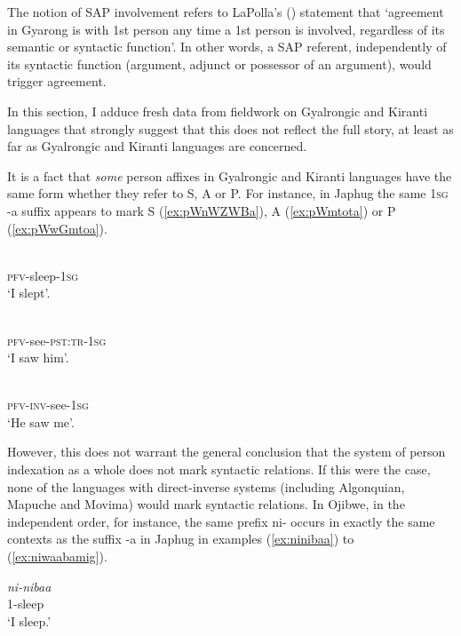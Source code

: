 \documentclass[oldfontcommands,oneside,a4paper,11pt]{article}
\newcommand{\ipa}[1]{{\phon \mbox{#1}}} %
\begin{document}
The notion of SAP involvement refers to LaPolla's (\citeyear[308]{lapolla92}) statement that `agreement in Gyarong is with 1st person any time a 1st person is involved, regardless of its semantic or syntactic function'. In other words, a SAP referent, independently of its syntactic function (argument, adjunct or possessor of an argument), would trigger agreement. 

In this section,  I adduce fresh data from fieldwork on Gyalrongic and Kiranti languages that strongly suggest that this does not reflect the full story, at least as far as Gyalrongic and Kiranti languages are concerned.

It is a fact that \textit{some} person affixes in Gyalrongic and Kiranti languages have the same form whether they refer to S, A or P. For instance, in Japhug the same \textsc{1sg} \ipa{-a} suffix appears to mark S (\ref{ex:pWnWZWBa}), A (\ref{ex:pWmtota}) or P (\ref{ex:pWwGmtoa}).

\begin{exe}
\ex \label{ex:pWnWZWBa}
\gll \ipa{pɯ-nɯʑɯβ-a} \\
\textsc{pfv}-sleep-\textsc{1sg} \\
\glt `I slept'.
\end{exe}

\begin{exe}
\ex \label{ex:pWmtota}
\gll \ipa{pɯ-mto-t-a} \\
\textsc{pfv}-see-\textsc{pst:tr}-\textsc{1sg} \\
\glt `I saw him'.
\end{exe}

\begin{exe}
\ex \label{ex:pWwGmtoa}
\gll \ipa{pɯ́-wɣ-mto-a} \\
\textsc{pfv}-\textsc{inv}-see-\textsc{1sg} \\
\glt `He saw me'.
\end{exe}

However, this does not warrant the general conclusion that  the system of person indexation as a whole does not mark syntactic relations. If this were the case, none of the languages with direct-inverse systems  (including Algonquian, Mapuche and Movima) would mark syntactic relations. In Ojibwe, in the independent order, for instance, the same prefix \ipa{ni-} occurs in exactly the same contexts as the suffix \ipa{-a} in Japhug in examples (\ref{ex:ninibaa}) to (\ref{ex:niwaabamig}). 

\begin{exe}
\ex  \label{ex:ninibaa}
\gll \textit{ni-nibaa} \\
1-sleep  \\
\glt `I sleep.'
\end{exe} 
\end{document}
